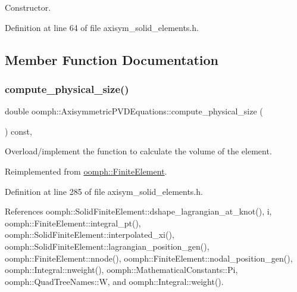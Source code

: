 Constructor. 



Definition at line 64 of file axisym\+\_\+solid\+\_\+elements.\+h.



\subsection{Member Function Documentation}
\mbox{\label{classoomph_1_1AxisymmetricPVDEquations_ac4d790ab3df428eb178c247f0ff13c29}} 
\subsubsection{\texorpdfstring{compute\+\_\+physical\+\_\+size()}{compute\_physical\_size()}}
{\footnotesize\ttfamily double oomph\+::\+Axisymmetric\+P\+V\+D\+Equations\+::compute\+\_\+physical\+\_\+size (\begin{DoxyParamCaption}{ }\end{DoxyParamCaption}) const\hspace{0.3cm}{\ttfamily [inline]}, {\ttfamily [virtual]}}



Overload/implement the function to calculate the volume of the element. 



Reimplemented from \hyperlink{classoomph_1_1FiniteElement_a782a540035dc31cb6ef548d9d930d8b8}{oomph\+::\+Finite\+Element}.



Definition at line 285 of file axisym\+\_\+solid\+\_\+elements.\+h.



References oomph\+::\+Solid\+Finite\+Element\+::dshape\+\_\+lagrangian\+\_\+at\+\_\+knot(), i, oomph\+::\+Finite\+Element\+::integral\+\_\+pt(), oomph\+::\+Solid\+Finite\+Element\+::interpolated\+\_\+xi(), oomph\+::\+Solid\+Finite\+Element\+::lagrangian\+\_\+position\+\_\+gen(), oomph\+::\+Finite\+Element\+::nnode(), oomph\+::\+Finite\+Element\+::nodal\+\_\+position\+\_\+gen(), oomph\+::\+Integral\+::nweight(), oomph\+::\+Mathematical\+Constants\+::\+Pi, oomph\+::\+Quad\+Tree\+Names\+::W, and oomph\+::\+Integral\+::weight().

